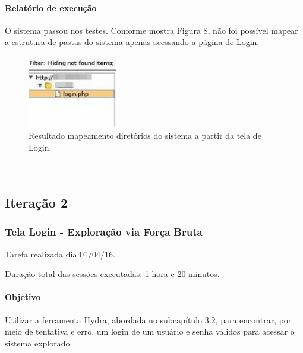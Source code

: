 \documentclass[
    12pt,               %
    openright,          %
    oneside,            %
    a4paper,            %
    section=TITLE,     %
    english,            %
    french,             %
    spanish,            %
    brazil              %
    ]{abntex2}
\begin{document}
\paragraph*{Relatório de execução}

O sistema passou nos testes. Conforme mostra Figura 8, não foi possível mapear a estrutura de pastas do sistema apenas acessando a página de Login.





\begin{figure}[htp]
\centering
\caption{Resultado mapeamento diretórios do sistema a partir da tela de Login.}
\includegraphics[width=152px]{imagem3Editada.jpeg}
\end{figure}
\ifdefined\FloatBarrier \FloatBarrier \fi



\paragraph*{~}


\subsection{Iteração 2}




\subsubsection*{Tela Login - Exploração via Força Bruta}

Tarefa realizada dia 01/04/16.


Duração total das sessões executadas: 1 hora e 20 minutos.



\paragraph*{Objetivo}

Utilizar a ferramenta Hydra, abordada no subcapítulo 3.2, para encontrar, por meio de tentativa e erro, um login de um usuário e senha válidos para acessar o sistema explorado.
\end{document}
